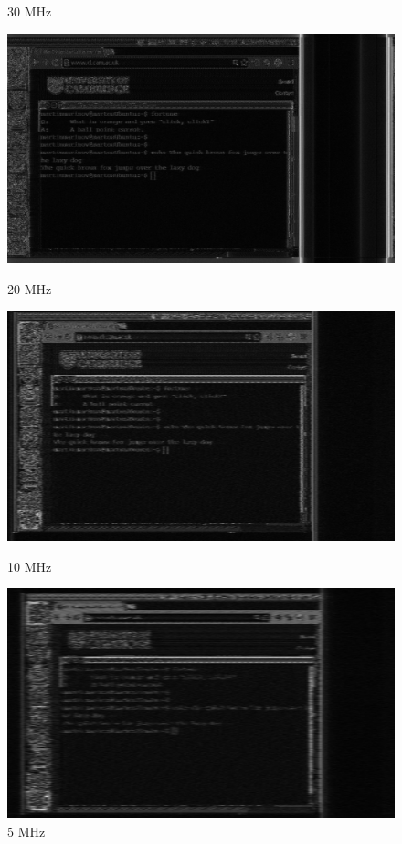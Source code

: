 \documentclass[a4paper,12pt,twoside,openright]{report}
\begin{document}
\begin{figure}[h!]
  \caption{30 MHz}
\endminipage\hfill
{}
  \centering
    \includegraphics[width=\linewidth]{sr_20MHz_at_190MHz}
  \caption{20 MHz}
\endminipage\hfill
{}
  \centering
    \includegraphics[width=\linewidth]{sr_10MHz_at_190MHz}
  \caption{10 MHz}
\endminipage\hfill
{}
  \centering
    \includegraphics[width=\linewidth]{sr_5MHz_at_190MHz}
  \caption{5 MHz}
\endminipage
\end{figure}
\end{document}
